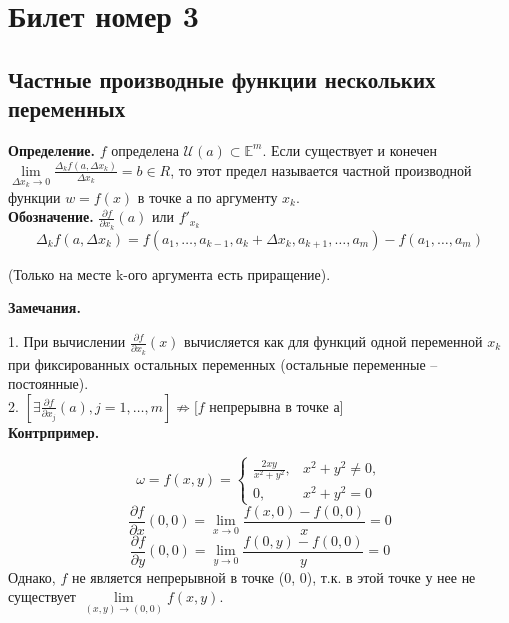 \documentclass[a4paper,14pt]{article} %
\begin{document}
	
	\section*{Билет номер 3}
	
	\subsection*{Частные производные функции нескольких переменных}  
	
	\textbf{Определение.} $f$ определена $\mathscr{U}(a) \subset \mathds{E}^m$. Если существует и конечен $\lim\limits_{\Delta{x_k}\to 0} \frac{\Delta_k f(a, \Delta{x_k})}{\Delta{x_k}}=b \in R$, то этот предел называется частной производной функции $w = f(x)$ в точке а по аргументу $x_k$.\\
	
	\textbf{Обозначение.}  $\frac{\partial f}{\partial x_k}(a)$ или $f'_{x_k}$
	\[\Delta_k f(a, \Delta{x_k}) = f(a_1, \ldots, a_{k-1}, a_k + \Delta x_k, a_{k+1}, \ldots, a_m) - f(a_1, \ldots, a_m)\] 
	\begin{center}
	(Только на месте k-ого аргумента есть приращение).\\
	\end{center}

	\textbf{Замечания.}
	 
	1. При вычислении  $\frac{\partial f}{\partial x_k}(x)$ вычисляется как для функций одной переменной $x_k$ при фиксированных остальных переменных (остальные переменные -- постоянные).\\
	
	2. $\left[\exists \frac{\partial f}{\partial x_j}(a), j = 1, \ldots, m\right] \not\Rightarrow [f$ непрерывна в точке а$]$ \\
	
	\textbf{Контрпример.}
	
	\begin{equation*}
		\omega = f(x, y) = 
		\begin{cases}
			\frac{2xy}{x^2 + y^2}, & x^2 + y^2 \not=0,\\
			0, & x^2 + y^2 = 0
		\end{cases}
	\end{equation*}
	\[\frac{\partial f}{\partial x}(0,0) = \lim_{x\to 0} \frac{f(x, 0) - f(0, 0)}{x} = 0\]
	\[\frac{\partial f}{\partial y}(0,0) = \lim_{y\to 0} \frac{f(0, y) - f(0, 0)}{y} = 0\]
	Однако, $f$ не является непрерывной в точке (0, 0), т.к. в этой точке у нее не существует $\lim\limits_{(x, y) \to (0, 0)} f(x, y)$.\\
	
\end{document}
